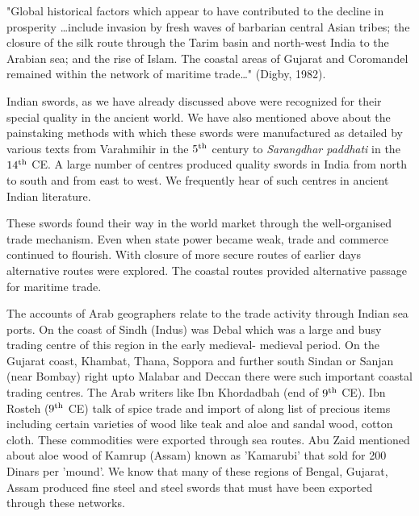 "Global historical factors which appear to have contributed to the decline in prosperity …include invasion by fresh waves of barbarian central Asian tribes; the closure of the silk route through the Tarim basin and north-west India to the Arabian sea; and the rise of Islam. The coastal areas of Gujarat and Coromandel remained within the network of maritime trade…" (Digby, 1982).

Indian swords, as we have already discussed above were recognized for their special quality in the ancient world. We have also mentioned above about the painstaking methods with which these swords were manufactured as detailed by various texts from Varahmihir in the $5^{\rm th}$ century to {\it Sarangdhar paddhati} in the $14^{\rm th}$ CE. A large number of centres produced quality swords in India from north to south and from east to west. We frequently hear of such centres in ancient Indian literature.

These swords found their way in the world market through the well-organised trade mechanism. Even when state power became weak, trade and commerce continued to flourish. With closure of more secure routes of earlier days alternative routes were explored. The coastal routes provided alternative passage for maritime trade.

The accounts of Arab geographers relate to the trade activity through Indian sea ports. On the coast of Sindh (Indus) was Debal which was a large and busy trading centre of this region in the early medieval- medieval period. On the Gujarat coast, Khambat, Thana, Soppora and further south Sindan or Sanjan (near Bombay) right upto Malabar and Deccan there were such important coastal trading centres. The Arab writers like Ibn Khordadbah (end of $9^{\rm th}$ CE). Ibn Rosteh ($9^{\rm th}$ CE) talk of spice trade and import of along list of precious items including certain varieties of wood like teak and aloe and sandal wood, cotton cloth. These commodities were exported through sea routes. Abu Zaid mentioned about aloe wood of Kamrup (Assam) known as 'Kamarubi' that sold for 200 Dinars per 'mound'. We know that many of these regions of Bengal, Gujarat, Assam produced fine steel and steel swords that must have been exported through these networks.

